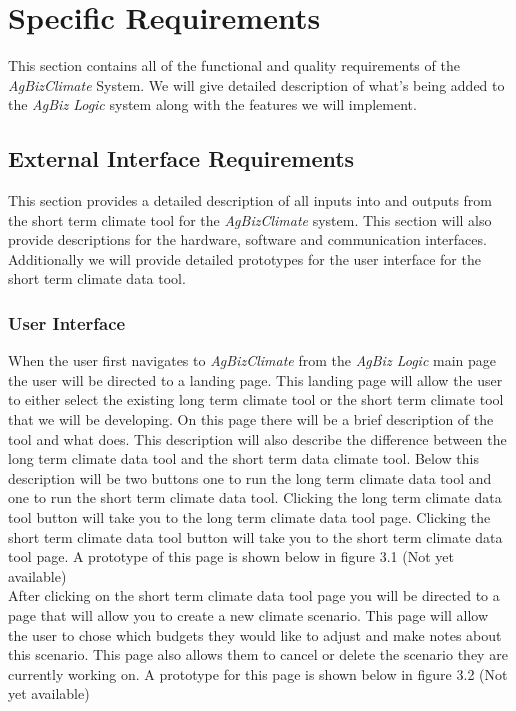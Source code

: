\documentclass[onecolumn, draftclsnofoot,10pt, compsoc]{article}
\begin{document}
\section{Specific Requirements}
This section contains all of the functional and quality requirements of the \textit{AgBizClimate} System. We will give detailed description of what's being added to the \textit{AgBiz Logic} system along with the features we will implement.\\
    \subsection{External Interface Requirements}
		This section provides a detailed description of all inputs into and outputs from the short term climate tool for the \textit{AgBizClimate} system. This section will also provide descriptions for the hardware, software and communication interfaces. Additionally we will provide detailed prototypes for the user interface for the short term climate data tool.\\
        \subsubsection{User Interface}
					When the user first navigates to \textit{AgBizClimate} from the \textit{AgBiz Logic} main page the user will be directed to a landing page. This landing page will allow the user to either select the existing long term climate tool or the short term climate tool that we will be developing. On this page there will be a brief description of the tool and what does. This description will also describe the difference between the long term climate data tool and the short term data climate tool. Below this description will be two buttons one to run the long term climate data tool and one to run the short term climate data tool. Clicking the long term climate data tool button will take you to the long term climate data tool page. Clicking the short term climate data tool button will take you to the short term climate data tool page. A prototype of this page is shown below in figure 3.1 (Not yet available)\\

					After clicking on the short term climate data tool page you will be directed to a page that will allow you to create a new climate scenario. This page will allow the user to chose which budgets they would like to adjust and make notes about this scenario. This page also allows them to cancel or delete the scenario they are currently working on. A prototype for this page is shown below in figure 3.2 (Not yet available)\\
\end{document}
